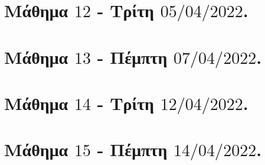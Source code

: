 \documentclass[oneside,a4paper]{article}
\begin{document}
\pagebreak


\section*{Μάθημα $12$ - Τρίτη $05/04/2022$.}
\vspace{0.3truecm}


\pagebreak

\section*{Μάθημα $13$ - Πέμπτη $07/04/2022$.}
\vspace{0.3truecm}


\pagebreak



\section*{Μάθημα $14$ - Τρίτη $12/04/2022$.}
\vspace{0.3truecm}


\pagebreak

\section*{Μάθημα $15$ - Πέμπτη $14/04/2022$.}
\vspace{0.3truecm}


\pagebreak
\end{document}
